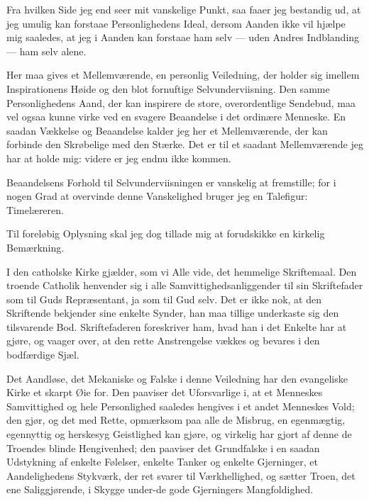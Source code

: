 \documentclass[12pt,a4paper]{book}
\newcommand{\apage}[1]{\marginnote{\footnotesize\textit{[#1]}}}
\begin{document}
Fra hvilken Side jeg end seer mit vanskelige Punkt, saa faaer jeg bestandig
ud, at jeg umulig kan forstaae Personlighedens Ideal, dersom Aanden ikke vil
hjælpe mig saaledes, at jeg i Aanden kan forstaae ham selv --- uden Andres
Indblanding --- ham selv alene.

Her maa gives et Mellemværende, en personlig Veiledning, der holder sig
imellem Inspirationens Høide og den blot fornuftige Selvunderviisning. Den
samme Personlighedens Aand, der kan inspirere de store, overordentlige
Sendebud, maa vel ogsaa kunne virke ved en svagere Beaandelse i det
ordinære Menneske. En saadan Vækkelse og Beaandelse kalder jeg her et
Mellemværende, der kan forbinde den Skrøbelige med den Stærke. Det er til
et saadant Mellemværende jeg har at holde mig: videre er jeg endnu ikke
kommen.
 \apage{109}

Beaandelsens Forhold til Selvunderviisningen er vanskelig at fremstille; for
i nogen Grad at overvinde denne Vanskelighed bruger jeg en Talefigur:
Timelæreren.

Til foreløbig Oplysning skal jeg dog tillade mig at forudskikke en kirkelig
Bemærkning.

I den catholske Kirke gjælder, som vi Alle vide, det hemmelige Skriftemaal.
Den troende Catholik henvender sig i alle Samvittighedsanliggender til sin
Skriftefader som til Guds Repræsentant, ja som til Gud selv. Det er ikke
nok, at den Skriftende bekjender sine enkelte Synder, han maa tillige
underkaste sig den tilsvarende Bod. Skriftefaderen foreskriver ham, hvad
han i det Enkelte har at gjøre, og vaager over, at den rette Anstrengelse
vækkes og bevares i den bodfærdige Sjæl.

Det Aandløse, det Mekaniske og Falske i denne Veiledning har den
evangeliske Kirke et skarpt Øie for. Den paaviser det Uforsvarlige i, at et
Menneskes Samvittighed og hele Personlighed saaledes hengives i et andet
Menneskes Vold; den gjør, og det med Rette, opmærksom paa alle de Misbrug,
en egenmægtig, egennyttig og herskesyg Geistlighed kan gjøre, og virkelig
har gjort af denne de Troendes blinde Hengivenhed; den paaviser det
Grundfalske i en saadan Udstykning af enkelte Følelser, enkelte Tanker og
enkelte Gjerninger, et Aandelighedens Stykværk, der ret svarer til
Værkhellighed, og sætter Troen, det ene Saliggjørende, i Skygge under-de
gode Gjerningers Mangfoldighed.
\end{document}
